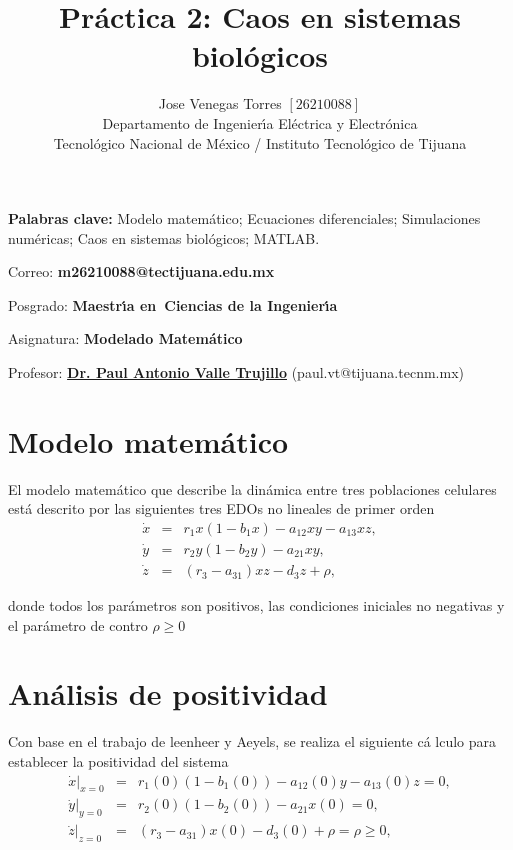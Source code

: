 \documentclass[letterpaper,11pt]{article}
\begin{document}
\title{Pr\'{a}ctica 2: Caos en sistemas biol\'{o}gicos}
\author{Jose Venegas Torres $\left[ 26210088\right] $ \\
Departamento de Ingenier\'{\i}a El\'{e}ctrica y Electr\'{o}nica\\
Tecnol\'{o}gico Nacional de M\'{e}xico / Instituto Tecnol\'{o}gico de Tijuana%
}
\maketitle

\noindent \textbf{Palabras clave: }Modelo matem\'{a}tico; Ecuaciones
diferenciales; Simulaciones num\'{e}ricas; Caos en sistemas biol\'{o}gicos;
MATLAB.

\bigskip

\noindent Correo: \textbf{m26210088@tectijuana.edu.mx}

\noindent \noindent Posgrado: \textbf{Maestr\'{\i}a en\ Ciencias de la
Ingenier\'{\i}a }

\noindent Asignatura: \textbf{Modelado Matem\'{a}tico}

\noindent Profesor: \href{https://biomath.xyz/}{\textbf{Dr. Paul Antonio
Valle Trujillo}} (paul.vt@tijuana.tecnm.mx)

\bigskip

\section{Modelo matem\'{a}tico}

El modelo matem\'{a}tico que describe la din\'{a}mica entre tres poblaciones
celulares est\'{a} descrito por las siguientes tres EDOs no lineales de
primer orden%
\begin{eqnarray*}
\dot{x} &=&r_{1}x\left( 1-b_{1}x\right) -a_{12}xy-a_{13}xz, \\
\dot{y} &=&r_{2}y\left( 1-b_{2}y\right) -a_{21}xy, \\
\dot{z} &=&\left( r_{3}-a_{31}\right) xz-d_{3}z+\rho ,
\end{eqnarray*}

donde todos los par\'{a}metros son positivos, las condiciones iniciales no
negativas y el par\'{a}metro de contro $\rho \geq 0$

\section{An\'{a}lisis de positividad}

Con base en el trabajo de leenheer y Aeyels, se realiza el siguiente c\'{a}%
lculo para establecer la positividad del sistema%
\begin{eqnarray*}
\left. \dot{x}\right\vert _{x=0} &=&r_{1}\left( 0\right) \left(
1-b_{1}\left( 0\right) \right) -a_{12}\left( 0\right) y-a_{13}\left(
0\right) z=0, \\
\left. \dot{y}\right\vert _{y=0} &=&r_{2}\left( 0\right) \left(
1-b_{2}\left( 0\right) \right) -a_{21}x\left( 0\right) =0, \\
\left. \dot{z}\right\vert _{z=0} &=&\left( r_{3}-a_{31}\right) x\left(
0\right) -d_{3}\left( 0\right) +\rho =\rho \geq 0,
\end{eqnarray*}
\end{document}
